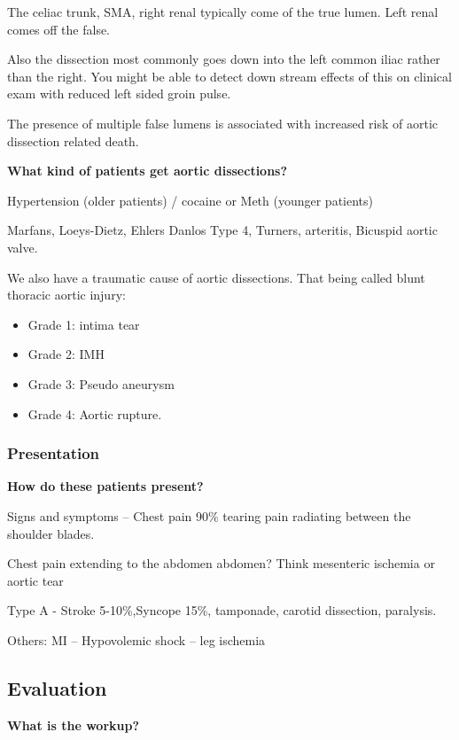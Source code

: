 \documentclass[
]{book}
\begin{document}
The celiac trunk, SMA, right renal typically come of the true lumen.
Left renal comes off the false.

Also the dissection most commonly goes down into the left common iliac
rather than the right. You might be able to detect down stream effects
of this on clinical exam with reduced left sided groin pulse.

The presence of multiple false lumens is associated with increased risk
of aortic dissection related death.\citep{sueyoshi2013}

\textbf{What kind of patients get aortic dissections?}

Hypertension (older patients) / cocaine or Meth (younger patients)

Marfans, Loeys-Dietz, Ehlers Danlos Type 4, Turners, arteritis, Bicuspid
aortic valve.

We also have a traumatic cause of aortic dissections. That being called
blunt thoracic aortic injury:

\begin{itemize}
\item
  Grade 1: intima tear
\item
  Grade 2: IMH
\item
  Grade 3: Pseudo aneurysm
\item
  Grade 4: Aortic rupture.
\end{itemize}

\hypertarget{presentation-11}{%
\subsubsection{Presentation}\label{presentation-11}}

\textbf{How do these patients present?}

Signs and symptoms -- Chest pain 90\% tearing pain radiating between the
shoulder blades.

Chest pain extending to the abdomen abdomen? Think mesenteric ischemia
or aortic tear

Type A - Stroke 5-10\%,Syncope 15\%, tamponade, carotid dissection,
paralysis.

Others: MI -- Hypovolemic shock -- leg ischemia

\hypertarget{evaluation-16}{%
\subsection{Evaluation}\label{evaluation-16}}

\textbf{What is the workup?}
\end{document}
